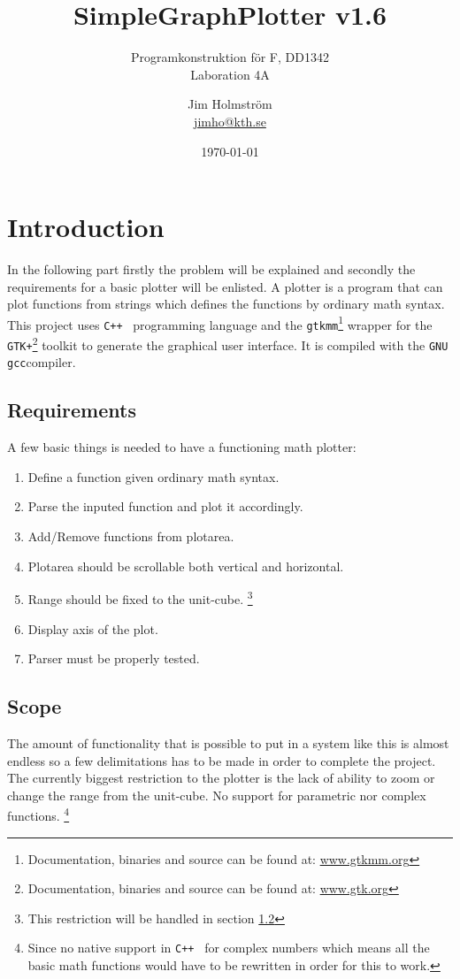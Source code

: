 \documentclass[a4paper,11pt]{kth-mag}
\title{SimpleGraphPlotter v1.6}
\subtitle{Programkonstruktion f\"{o}r F, DD1342\\ Laboration 4A}
\author{Jim Holmstr\"{o}m\\\href{mailto:jimho@kth.se}{jimho@kth.se}}
\date{\today}
\newcommand{\Cpp}{\texttt{C++}}
\newcommand{\Gcc}{\texttt{gcc}}
\newcommand{\Gtkmm}{\texttt{gtkmm}}
\newcommand{\Gtk}{\texttt{GTK+}}
\begin{document}
\frontmatter
\pagestyle{empty}
\removepagenumbers
\maketitle
{}
\tableofcontents*
\mainmatter
\pagestyle{newchap}

\chapter{Introduction}
In the following part firstly the problem will be explained and secondly 
the requirements for a basic plotter will be enlisted.
A plotter is a program that can plot functions from strings which defines the 
functions by ordinary math syntax. 
This project uses \Cpp~ programming language and the 
\Gtkmm\footnote{Documentation, binaries and source can be found at: 
\href{http://www.gtkmm.org}{www.gtkmm.org}} wrapper for the 
\Gtk\footnote{Documentation, binaries and source can be found at: 
\href{http://www.gtk.org}{www.gtk.org}} toolkit to generate the graphical user interface. 
It is compiled with the \texttt{GNU} \Gcc compiler.

\section{Requirements}
A few basic things is needed to have a functioning math plotter:
\begin{enumerate}
\item Define a function given ordinary math syntax.
\item Parse the inputed function and plot it accordingly.
\item Add/Remove functions from plotarea.
\item Plotarea should be scrollable both vertical and horizontal.
\item Range should be fixed to the unit-cube.
        \footnote{This restriction will be handled in section \ref{sec:scope}}
\item Display axis of the plot.
\item Parser must be properly tested.
\end{enumerate}

\section{Scope}
\label{sec:scope}
The amount of functionality that is possible to put in a system like this is
almost endless so a few delimitations has to be made in order to complete the project.
The currently biggest restriction to the plotter is the lack of 
ability to zoom or change the range from the unit-cube.
No support for parametric nor complex functions.
\footnote{
    Since no native support in \Cpp~ for complex numbers which means 
    all the basic math functions would have to be rewritten in order for this to work.
}
\end{document}
